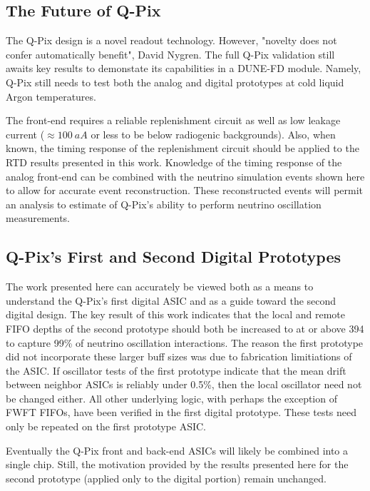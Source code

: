 \subsection{The Future of Q-Pix}

The Q-Pix design is a novel readout technology.
However, "novelty does not confer automatically benefit", David Nygren.
The full Q-Pix validation still awaits key results to demonstate its capabilities in a DUNE-FD module.
Namely, Q-Pix still needs to test both the analog and digital prototypes at cold liquid Argon temperatures.

The front-end requires a reliable replenishment circuit as well as low leakage current ($\approx 100~\unit{aA}$ or less to be below radiogenic backgrounds).
Also, when known, the timing response of the replenishment circuit should be applied to the RTD results presented in this work.
Knowledge of the timing response of the analog front-end can be combined with the neutrino simulation events shown here to allow for accurate event reconstruction.
These reconstructed events will permit an analysis to estimate of Q-Pix's ability to perform neutrino oscillation measurements.

\subsection{Q-Pix's First and Second Digital Prototypes}

The work presented here can accurately be viewed both as a means to understand the Q-Pix's first digital ASIC and as a guide toward the second digital design.
The key result of this work indicates that the local and remote FIFO depths of the second prototype should both be increased to at or above 394 to capture 99\% of neutrino oscillation interactions.
The reason the first prototype did not incorporate these larger buff sizes was due to fabrication limitiations of the ASIC.
If oscillator tests of the first prototype indicate that the mean drift between neighbor ASICs is reliably under 0.5\%, then the local oscillator need not be changed either.
All other underlying logic, with perhaps the exception of FWFT FIFOs, have been verified in the first digital prototype.
These tests need only be repeated on the first prototype ASIC.

Eventually the Q-Pix front and back-end ASICs will likely be combined into a single chip.
Still, the motivation provided by the results presented here for the second prototype (applied only to the digital portion) remain unchanged.
